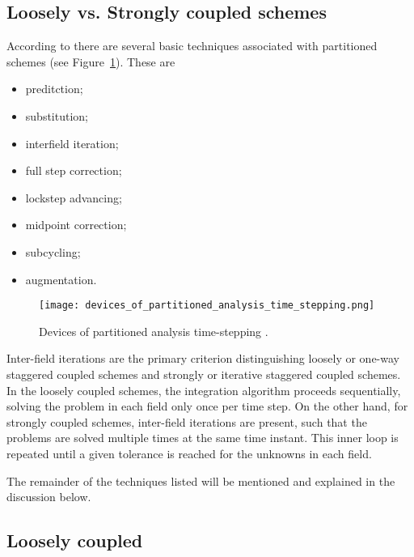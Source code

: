 \subsection{Loosely vs. Strongly coupled schemes} \label{sec:loosely_strong_comp}


According to \cite{felippa_partitioned_2001} there are several basic techniques associated with partitioned schemes (see Figure~\ref{fig:devices_of_partitioned_analysis_time_stepping}).
These are
\begin{itemize}
  \item preditction;
  \item substitution;
  \item interfield iteration;
  \item full step correction;
  \item lockstep advancing;
  \item midpoint correction;
  \item subcycling;
  \item augmentation.
\end{itemize}

\begin{figure}[htbp]
  \texttt{[image: devices\_of\_partitioned\_analysis\_time\_stepping.png]}
  \caption{Devices of partitioned analysis time-stepping \citep{felippa_partitioned_2001}.}
\label{fig:devices_of_partitioned_analysis_time_stepping}
\end{figure}

Inter-field iterations are the primary criterion distinguishing loosely or one-way staggered coupled schemes and strongly or iterative staggered coupled schemes.
In the loosely coupled schemes, the integration algorithm proceeds sequentially, solving the problem in each field only once per time step.
On the other hand, for strongly coupled schemes, inter-field iterations are present, such that the problems are solved multiple times at the same time instant.
This inner loop is repeated until a given tolerance is reached for the unknowns in each field.

The remainder of the techniques listed will be mentioned and explained in the discussion below.

\subsection{Loosely coupled}



